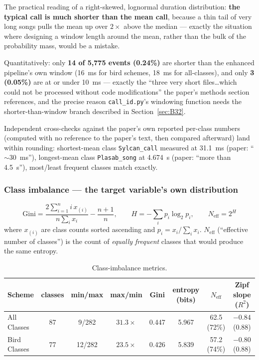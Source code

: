 \documentclass[11pt]{article}
\begin{document}
The practical reading of a right-skewed, lognormal duration distribution:
\textbf{the typical call is much shorter than the mean call}, because a thin
tail of very long songs pulls the mean up over $2\times$ above the median ---
exactly the situation where designing a window length around the mean,
rather than the bulk of the probability mass, would be a mistake.

Quantitatively: only \textbf{14 of 5{,}775 events (0.24\%)} are shorter than
the enhanced pipeline's own window (16~ms for bird schemes, 18~ms for
all-classes), and only \textbf{3 (0.05\%)} are at or under 10~ms --- exactly
the ``three very short files\ldots which could not be processed without code
modifications'' the paper's methods section references, and the precise
reason \texttt{call\_id.py}'s windowing function needs the
shorter-than-window branch described in Section~\ref{sec:B32}.

Independent cross-checks against the paper's own reported per-class numbers
(computed with no reference to the paper's text, then compared afterward)
land within rounding: shortest-mean class \texttt{Sylcan\_call} measured at
31.1~ms (paper: ``$\sim$30~ms''), longest-mean class \texttt{Plasab\_song}
at 4.674~s (paper: ``more than 4.5~s''), most/least frequent classes match
exactly.

\subsubsection{Class imbalance --- the target variable's own distribution}
\label{sec:A54}

\[
\text{Gini} = \frac{2\sum_{i=1}^{n} i\,x_{(i)}}{n\sum_i x_i} - \frac{n+1}{n},
\qquad
H = -\sum_i p_i\log_2 p_i,
\qquad
N_{\text{eff}} = 2^{H}
\]
where $x_{(i)}$ are class counts sorted ascending and $p_i=x_i/\sum_i x_i$.
$N_{\text{eff}}$ (``effective number of classes'') is the count of
\emph{equally frequent} classes that would produce the same entropy.

\begin{table}[h]
\centering
\caption{Class-imbalance metrics.}
\label{tab:imbalance}
\begin{tabular}{l c c c c c c c}
\toprule
Scheme & classes & min/max & max/min & Gini & entropy (bits) & $N_{\text{eff}}$ & Zipf slope ($R^2$) \\
\midrule
All Classes  & 87 & 9/282  & $31.3\times$ & 0.447 & 5.967 & 62.5 (72\%) & $-0.84$ (0.88) \\
Bird Classes & 77 & 12/282 & $23.5\times$ & 0.426 & 5.839 & 57.2 (74\%) & $-0.80$ (0.88) \\
\bottomrule
\end{tabular}
\end{table}
\end{document}
